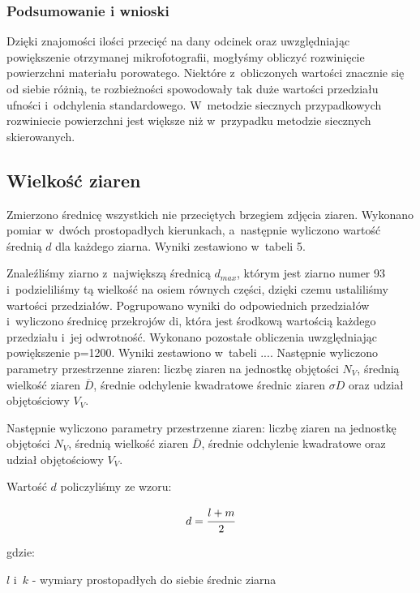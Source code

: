 \documentclass[a4paper,12pt]{article}
\begin{document}
\newpage
{\color{purple}
\subsubsection{Podsumowanie i wnioski}



Dzięki znajomości ilości przecięć na dany odcinek oraz uwzględniając powiększenie otrzymanej mikrofotografii, mogłyśmy obliczyć rozwinięcie powierzchni materiału porowatego. Niektóre z~obliczonych wartości znacznie się od siebie różnią, te rozbieżności spowodowały tak duże wartości przedziału ufności i~odchylenia standardowego. W~metodzie siecznych przypadkowych rozwiniecie powierzchni jest większe niż w~przypadku metodzie siecznych skierowanych.}
\newpage

\subsection{Wielkość ziaren}

Zmierzono średnicę wszystkich nie przeciętych brzegiem zdjęcia ziaren. Wykonano pomiar w~dwóch prostopadłych kierunkach, a~następnie wyliczono wartość średnią $d$ dla każdego ziarna. Wyniki zestawiono w~tabeli 5.

Znaleźliśmy ziarno z~największą średnicą $d_{max}$, którym jest ziarno numer 93 i~podzieliliśmy tą wielkość na osiem równych części, dzięki czemu ustaliliśmy wartości przedziałów. Pogrupowano wyniki do odpowiednich przedziałów i~wyliczono średnicę przekrojów di, która jest środkową wartością każdego przedziału i~jej odwrotność. Wykonano pozostałe obliczenia uwzględniając powiększenie p=1200. Wyniki zestawiono w~tabeli ....
Następnie wyliczono parametry przestrzenne ziaren: liczbę ziaren na jednostkę objętości $N_V$, średnią wielkość ziaren $\overline{D}$, średnie odchylenie kwadratowe średnic ziaren $\sigma D$ oraz udział objętościowy $V_V$.

Następnie wyliczono parametry przestrzenne ziaren: liczbę ziaren na jednostkę objętości $N_V$, średnią wielkość ziaren $\overline{D}$, średnie odchylenie kwadratowe oraz udział objętościowy $V_V$.

Wartość $d$ policzyliśmy ze wzoru:

$$d=\cfrac{l+m}{2}$$

gdzie:

$l$ i~$k$ - wymiary prostopadłych do siebie średnic ziarna
\end{document}
